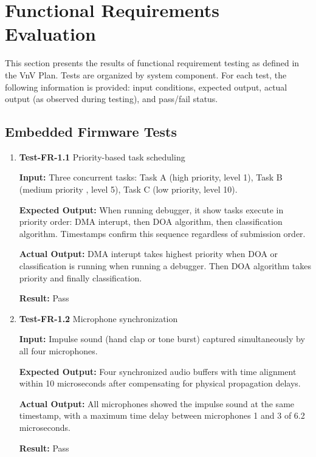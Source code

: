 \documentclass[12pt, titlepage]{article}
\begin{document}
\section{Functional Requirements Evaluation}\label{sec:func}

This section presents the results of functional requirement testing as defined
in the VnV Plan. Tests are organized by system component. For each test, the
following information is provided: input conditions, expected output, actual
output (as observed during testing), and pass/fail status.

\subsection{Embedded Firmware Tests}

\begin{enumerate}

\item{\textbf{Test-FR-1.1} Priority-based task scheduling \\}

\textbf{Input:}
Three concurrent tasks: Task A (high priority, level 1), Task B (medium priority
, level 5), Task C (low priority, level 10).

\textbf{Expected Output:}
When running debugger, it show tasks execute in priority order: DMA interupt,
then DOA algorithm, then classification algorithm. Timestamps confirm this
sequence regardless of submission order.

\textbf{Actual Output:}
DMA interupt takes highest priority when DOA or classification is running when
running a debugger. Then DOA algorithm takes priority and finally
classification.

\textbf{Result:} Pass

\item{\textbf{Test-FR-1.2} Microphone synchronization \\}

\textbf{Input:}
Impulse sound (hand clap or tone burst) captured simultaneously by all four
microphones.

\textbf{Expected Output:}
Four synchronized audio buffers with time alignment within 10 microseconds after
compensating for physical propagation delays.

\textbf{Actual Output:}
All microphones showed the impulse sound at the same timestamp, with a maximum
time delay between microphones 1 and 3 of 6.2 microseconds.

\textbf{Result:} Pass


\end{enumerate}
\end{document}
